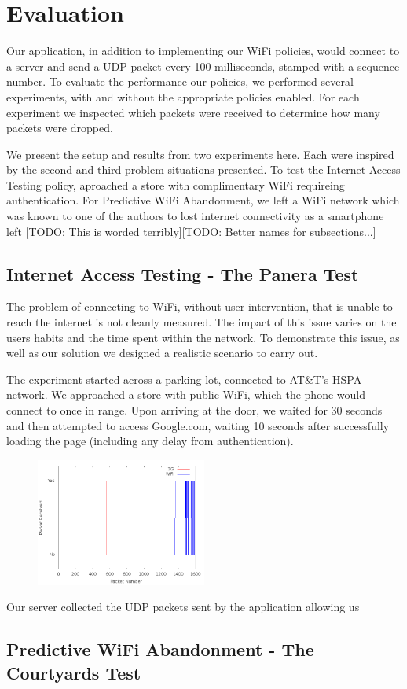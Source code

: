 \section{Evaluation}
\label{sec:eval}

Our application, in addition to implementing our WiFi policies, would connect to a server and send a UDP packet every 100 milliseconds, stamped with a sequence number. To evaluate the performance our policies, we performed several experiments, with and without the appropriate policies enabled. For each experiment we inspected which packets were received to determine how many packets were dropped.

We present the setup and results from two experiments here. Each were inspired by the second and third problem situations presented. To test the Internet Access Testing policy, aproached a store with complimentary WiFi requireing authentication. For Predictive WiFi Abandonment, we left a WiFi network which was known to one of the authors to lost internet connectivity as a smartphone left [TODO: This is worded terribly][TODO: Better names for subsections...]

\subsection{Internet Access Testing - The Panera Test}
The problem of connecting to WiFi, without user intervention, that is unable to reach the internet is not cleanly measured. The impact of this issue varies on the users habits and the time spent within the network. To demonstrate this issue, as well as our solution we designed a realistic scenario to carry out. 

The experiment started across a parking lot, connected to AT\&T's HSPA network. We approached a store with public WiFi, which the phone would connect to once in range. Upon arriving at the door, we waited for 30 seconds and then attempted to access Google.com, waiting 10 seconds after successfully loading the page (including any delay from authentication).

\begin{figure}
	\includegraphics[width=0.5\textwidth]{paneraNoPolicy}
\end{figure}

Our server collected the UDP packets sent by the application allowing us 

\subsection{Predictive WiFi Abandonment - The Courtyards Test}
